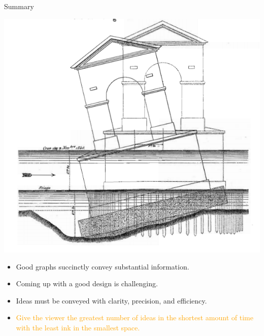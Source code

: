 \documentclass[
  ignorenonframetext,
]{beamer}
\begin{document}
\begin{frame}{Summary}
\protect\hypertarget{summary}{}
\begin{minipage}{0.45\textwidth}
\centering
\includegraphics[width=\textwidth]{excellence_figs/fig_35.png}
\end{minipage}
\hfill
\begin{minipage}{0.5\textwidth}
\footnotesize
\begin{itemize}
  \item Good graphs succinctly convey substantial information.
  \item Coming up with a good design is challenging.
  \item Ideas must be conveyed with clarity, precision, and efficiency.
  \item \textcolor{orange}{Give the viewer the greatest number of ideas in the shortest amount of time with the least ink in the smallest space.}
\end{itemize}
\end{minipage}
\end{frame}
\end{document}
